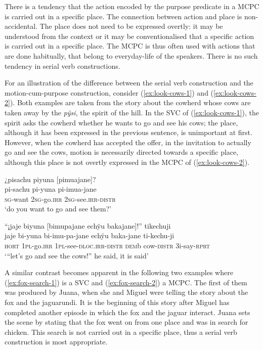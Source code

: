 There is a tendency that the action encoded by the purpose predicate in a MCPC is carried out in a specific place. The connection between action and place is non-accidental. The place does not need to be expressed overtly: it may be understood from the context or it may be conventionalised that a specific action is carried out in a specific place. The MCPC is thus often used with actions that are done habitually, that belong to everyday-life of the speakers. There is no such tendency in serial verb constructions. 


For an illustration of the difference between the serial verb construction and the motion-cum-purpose construction, consider (\ref{ex:look-cows-1}) and (\ref{ex:look-cows-2}). Both examples are taken from the story about the cowherd whose cows are taken away by the \textit{pÿsi}, the spirit of the hill. In the SVC of (\ref{ex:look-cows-1}), the spirit asks the cowherd whether he wants to go and see his cows; the place, although it has been expressed in the previous sentence, is unimportant at first. However, when the cowherd has accepted the offer, in the invitation to actually go and see the cows, motion is necessarily directed towards a specific place, although this place is not overtly expressed in the MCPC of (\ref{ex:look-cows-2}).

\ea\label{ex:look-cows-1}
\begingl
\glpreamble ¿pisachu piyuna \textup{[}pimuajane\textup{]}?\\
\gla pi-sachu pi-yuna pi-imua-jane\\ 
\textsc{sg}-want 2\textsc{sg}-go.\textsc{irr} 2\textsc{sg}-see.\textsc{irr}-\textsc{distr}\\ 
\glft ‘do you want to go and see them?’\\ 
\endgl
\trailingcitation{[mxx-n151017l-1.35]}
\xe


\ea\label{ex:look-cows-2}
\begingl
\glpreamble “¡jaje biyuna \textup{[}bimupajane echÿu bakajane\textup{]}!” tikechuji\\
\gla jaje bi-yuna bi-imu-pa-jane echÿu baka-jane ti-kechu-ji\\ 
\glb \textsc{hort} 1\textsc{pl}-go.\textsc{irr} 1\textsc{pl}-see-\textsc{dloc.irr}-\textsc{distr} \textsc{dem}b cow-\textsc{distr} 3i-say-\textsc{rprt}\\ 
\glft ‘“let’s go and see the cows!” he said, it is said’\\ 
\endgl
\trailingcitation{[mxx-n151017l-1.38]}
\xe


A similar contrast becomes apparent in the following two examples where (\ref{ex:fox-search-1}) is a SVC and (\ref{ex:fox-search-2}) a MCPC. The first of them was produced by Juana, when she and Miguel were telling the story about the fox and the jaguarundi. It is the beginning of this story after Miguel has completed another episode in which the fox and the jaguar interact. Juana sets the scene by stating that the fox went on from one place and was in search for chicken. This search is not carried out in a specific place, thus a serial verb construction is most appropriate.

